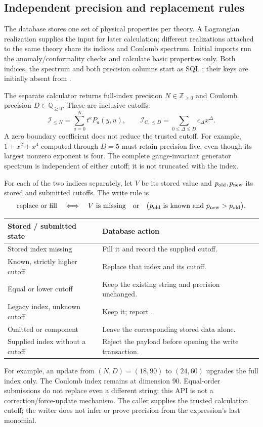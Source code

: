 \subsection{Independent precision and replacement rules}
The database stores one set of physical properties per theory. A Lagrangian
realization supplies the input for later calculation; different realizations
attached to the same theory share its indices and Coulomb spectrum.
Initial imports run the anomaly/conformality checks and calculate basic
properties only. Both indices, the spectrum and both precision columns start
as SQL ; their keys are initially absent from .

The separate calculator returns full-index precision $N\in\mathbb Z_{\geq0}$
and Coulomb precision $D\in\mathbb Q_{\geq0}$. These are inclusive cutoffs:
\[
 \mathcal I_{\leq N}=\sum_{a=0}^{N}t^a P_a(y,u),\qquad
 \mathcal I_{\mathrm C,\leq D}=\sum_{0\leq\Delta\leq D}c_\Delta x^\Delta.
\]
A zero boundary coefficient does not reduce the trusted cutoff. For example,
$1+x^2+x^4$ computed through $D=5$ must retain precision five, even though its
largest nonzero exponent is four. The complete gauge-invariant generator
spectrum is independent of either cutoff; it is not truncated with the index.

For each of the two indices separately, let $V$ be its stored value and
$p_{\rm old},p_{\rm new}$ its stored and submitted cutoffs. The write rule is
\[
 \text{replace or fill}\quad\Longleftrightarrow\quad
 V\text{ is missing}\quad\text{or}\quad
 \bigl(p_{\rm old}\text{ is known and }p_{\rm new}>p_{\rm old}\bigr).
\]
\begin{tabularx}{\textwidth}{@{}p{50mm}Y@{}}
\toprule Stored / submitted state & Database action\\\midrule
Stored index missing & Fill it and record the supplied cutoff.\\
Known, strictly higher cutoff & Replace that index and its cutoff.\\
Equal or lower cutoff & Keep the existing string and precision unchanged.\\
Legacy index, unknown cutoff & Keep it; report .\\
Omitted or  component & Leave the corresponding stored data alone.\\
Supplied index without a cutoff & Reject the payload before opening the write transaction.\\\bottomrule
\end{tabularx}
For example, an update from $(N,D)=(18,90)$ to $(24,60)$ upgrades the full index
only. The Coulomb index remains at dimension 90. Equal-order submissions do
not replace even a different string; this API is not a correction/force-update
mechanism. The caller supplies the trusted calculation cutoff; the writer does
not infer or prove precision from the expression's last monomial.

